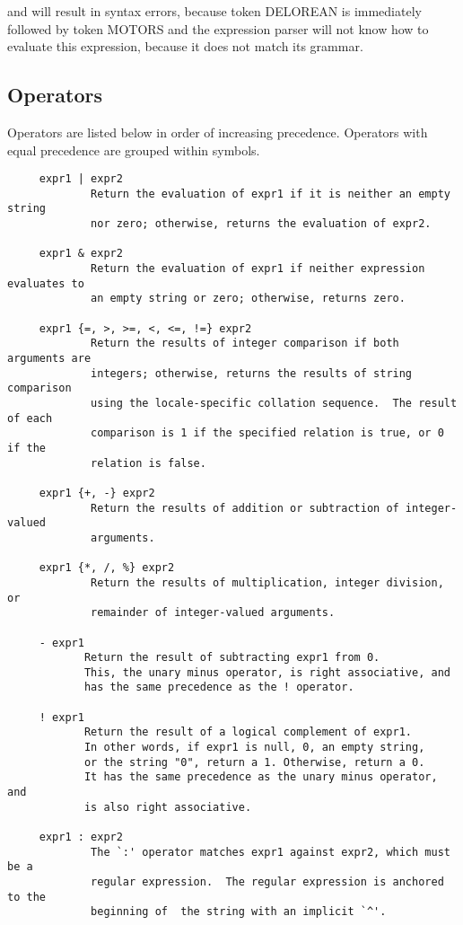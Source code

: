 and will result in syntax errors, because token DELOREAN is immediately
followed by token MOTORS and the expression parser will not know how to 
evaluate this expression, because it does not match its grammar.

\subsection{Operators}

Operators are listed below in order of increasing precedence.  Operators
with equal precedence are grouped within { } symbols.

\begin{verbatim}
     expr1 | expr2
             Return the evaluation of expr1 if it is neither an empty string
             nor zero; otherwise, returns the evaluation of expr2.

     expr1 & expr2
             Return the evaluation of expr1 if neither expression evaluates to
             an empty string or zero; otherwise, returns zero.

     expr1 {=, >, >=, <, <=, !=} expr2
             Return the results of integer comparison if both arguments are
             integers; otherwise, returns the results of string comparison
             using the locale-specific collation sequence.  The result of each
             comparison is 1 if the specified relation is true, or 0 if the
             relation is false.

     expr1 {+, -} expr2
             Return the results of addition or subtraction of integer-valued
             arguments.

     expr1 {*, /, %} expr2
             Return the results of multiplication, integer division, or
             remainder of integer-valued arguments.

     - expr1
            Return the result of subtracting expr1 from 0.
            This, the unary minus operator, is right associative, and
            has the same precedence as the ! operator.

     ! expr1
            Return the result of a logical complement of expr1.
            In other words, if expr1 is null, 0, an empty string,
            or the string "0", return a 1. Otherwise, return a 0.
            It has the same precedence as the unary minus operator, and
            is also right associative.

     expr1 : expr2
             The `:' operator matches expr1 against expr2, which must be a
             regular expression.  The regular expression is anchored to the
             beginning of  the string with an implicit `^'.


\end{verbatim}
